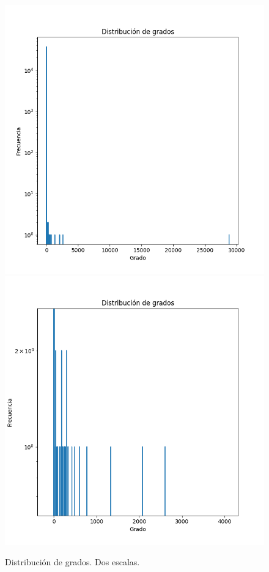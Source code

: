 \documentclass[12pt]{extreport}
\begin{document}
    \begin{figure}
        \centering
        \includegraphics[scale=0.6]{degree_dist.png}
        \includegraphics[scale=0.6]{degree_dist_detail.png}
        \caption{Distribución de grados. Dos escalas.}
        \label{fig:avgdeg}
    \end{figure}
\end{document}
